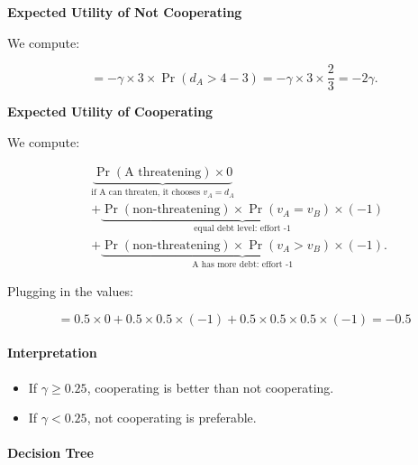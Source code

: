 \documentclass{article}
\begin{document}
\textbf{Expected Utility of Not Cooperating}

We compute:

\[
= -\gamma \times 3 \times \Pr(d_A > 4 - 3)
= -\gamma \times 3 \times \frac{2}{3}
= -2\gamma.
\]

\textbf{Expected Utility of Cooperating}

We compute:

\begin{align*}
&\underbrace{
    \Pr(\text{A threatening}) \times 0
}_{\text{if A can threaten, it chooses $v_A = d_A$}}
\\[3ex]
&+
\underbrace{
    \Pr(\text{non-threatening}) \times \Pr(v_A = v_B) \times (-1)
}_{\text{equal debt level: effort -1}}
\\[3ex]
&+
\underbrace{
    \Pr(\text{non-threatening}) \times \Pr(v_A > v_B) \times (-1)
}_{\text{A has more debt: effort -1}}.
\end{align*}

Plugging in the values:

\[
= 0.5 \times 0 
+ 0.5 \times 0.5 \times (-1)
+ 0.5 \times 0.5 \times 0.5 \times (-1)
= -0.5
\]



\paragraph{Interpretation}

\begin{itemize}
    \item If $\gamma \geq 0.25$, cooperating is better than not cooperating.
    \item If $\gamma < 0.25$, not cooperating is preferable.
\end{itemize}


\paragraph{Decision Tree}
\end{document}
